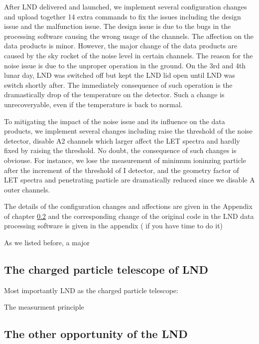 After LND delivered and launched, we implement several configuration changes and upload together 14 extra commands to fix the issues including the design issue and the malfunction issue. The design issue is due to the bugs in the processing software causing the wrong usage of the channels. The affection on the data products is minor. However, the major change of the data products are caused by the sky rocket of the noise level in certain channels. The reason for the noise issue is due to the unproper operation in the ground. On the 3rd and 4th lunar day, LND was switched off but kept the LND lid open until LND was switch shortly after. The immediately consequence of such operation is the dramastically drop of the temperature on the detector. Such a change is unrecoveryable, even if the temperature is back to normal.

To mitigating the impact of the noise issue and its influence on the data products, we implement several changes including raise the threshold of the noise detector, disable A2 channels which larger affect the LET spectra and hardly fixed by raising the threshold. No doubt, the consequence of such changes is obviouse. For instance, we lose the measurement of minimum ioninzing particle after the increment of the threshold of I detector, and the geometry factor of LET spectra and penetrating particle are dramatically reduced since we disable A outer channels. 

The details of the configuration changes and affections are given in the Appendix of chapter \ref{} and the corresponding change of the original code in the LND data processing software is given in the appendix ( if you have time to do it)

As we listed before, a major 

\subsection{The charged particle telescope of LND}








Most importantly LND as the charged particle telescope:

The measurment principle





\subsection{The other opportunity of the LND}


